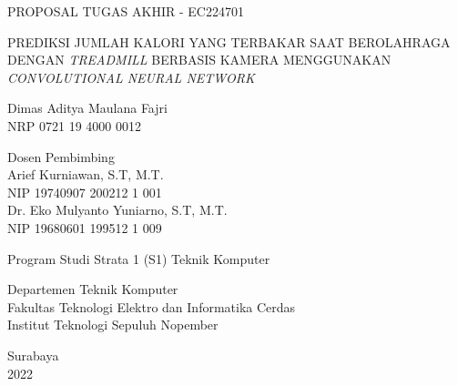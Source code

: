 \begin{large}
  PROPOSAL TUGAS AKHIR - EC224701
\end{large}

\vspace{\fill}

\begin{spacing}{1.5}
  \begin{Large}
    PREDIKSI JUMLAH KALORI YANG TERBAKAR SAAT
    BEROLAHRAGA DENGAN \emph{TREADMILL}
    BERBASIS KAMERA MENGGUNAKAN
    \emph{CONVOLUTIONAL NEURAL NETWORK}
  \end{Large}
\end{spacing}

\vspace{\fill}

\begin{large}
  Dimas Aditya Maulana Fajri \\
  \textmd{NRP 0721 19 4000 0012}
\end{large}

\vspace{\fill}

\begin{large}
  \textmd{Dosen Pembimbing} \\
  Arief Kurniawan, S.T, M.T. \\
  \textmd{NIP 19740907 200212 1 001} \\
  Dr. Eko Mulyanto Yuniarno, S.T, M.T. \\
  \textmd{NIP 19680601 199512 1 009}
\end{large}

\vspace{\fill}

Program Studi Strata 1 (S1) Teknik Komputer \\

\mdseries

Departemen Teknik Komputer \\
Fakultas Teknologi Elektro dan Informatika Cerdas \\
Institut Teknologi Sepuluh Nopember

Surabaya \\
2022
